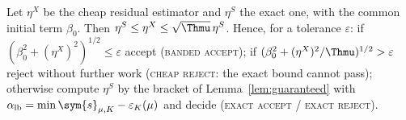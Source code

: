 \begin{proposition}\label{prop:twostage}
Let $\eta^X$ be the cheap residual estimator and $\eta^S$ the exact one, with the common
initial term $\beta_0$.  Then
$\eta^S\le\eta^X\le\sqrt{\Thmu}\,\eta^S$.  Hence, for a tolerance $\varepsilon$:
if $(\beta_0^2+(\eta^X)^2)^{1/2}\le\varepsilon$ accept (\textsc{banded accept});
if $(\beta_0^2+(\eta^X)^2/\Thmu)^{1/2}>\varepsilon$ reject without further work
(\textsc{cheap reject}: the exact bound cannot pass);
otherwise compute $\eta^S$ by the bracket of Lemma~\ref{lem:guaranteed} with
$\alpha_{\rm lb}=\min\sym{s}_{\mu,K}-\varepsilon_K(\mu)$ and decide
(\textsc{exact accept} / \textsc{exact reject}).
\end{proposition}

